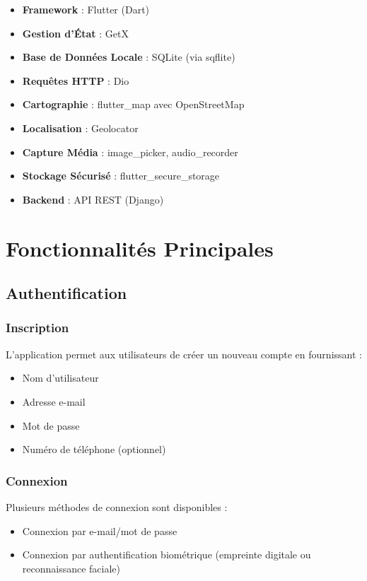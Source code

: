 \documentclass[12pt,a4paper]{article}
\begin{document}
\begin{itemize}
    \item \textbf{Framework} : Flutter (Dart)
    \item \textbf{Gestion d'État} : GetX
    \item \textbf{Base de Données Locale} : SQLite (via sqflite)
    \item \textbf{Requêtes HTTP} : Dio
    \item \textbf{Cartographie} : flutter\_map avec OpenStreetMap
    \item \textbf{Localisation} : Geolocator
    \item \textbf{Capture Média} : image\_picker, audio\_recorder
    \item \textbf{Stockage Sécurisé} : flutter\_secure\_storage
    \item \textbf{Backend} : API REST (Django)
\end{itemize}

\section{Fonctionnalités Principales}

\subsection{Authentification}

\subsubsection{Inscription}
L'application permet aux utilisateurs de créer un nouveau compte en fournissant :
\begin{itemize}
    \item Nom d'utilisateur
    \item Adresse e-mail
    \item Mot de passe
    \item Numéro de téléphone (optionnel)
\end{itemize}

\subsubsection{Connexion}
Plusieurs méthodes de connexion sont disponibles :
\begin{itemize}
    \item Connexion par e-mail/mot de passe
    \item Connexion par authentification biométrique (empreinte digitale ou reconnaissance faciale)
\end{itemize}
\end{document}
